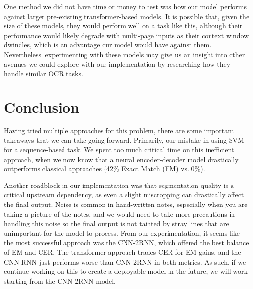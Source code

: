 \documentclass[11pt]{article}
\begin{document}
One method we did not have time or money to test was how our model performs against larger pre-existing transformer-based models. It is possible that, given the size of these models, they would perform well on a task like this, although their performance would likely degrade with multi-page inputs as their context window dwindles, which is an advantage our model would have against them. Nevertheless, experimenting with these models may give us an insight into other avenues we could explore with our implementation by researching how they handle similar OCR tasks.

\section{Conclusion}

Having tried multiple approaches for this problem, there are some important takeaways that we can take going forward. Primarily, our mistake in using SVM for a sequence-based task. We spent too much critical time on this inefficient approach, when we now know that a neural encoder-decoder model drastically outperforms classical approaches (42\% Exact Match (EM) vs. 0\%).

Another roadblock in our implementation was that segmentation quality is a critical upstream dependency, as even a slight miscropping can drastically affect the final output. Noise is common in hand-written notes, especially when you are taking a picture of the notes, and we would need to take more precautions in handling this noise so the final output is not tainted by stray lines that are unimportant for the model to process. From our experimentation, it seems like the most successful approach was the CNN-2RNN, which offered the best balance of EM and CER. The transformer approach trades CER for EM gains, and the CNN-RNN just performs worse than CNN-2RNN in both metrics. As such, if we continue working on this to create a deployable model in the future, we will work starting from the CNN-2RNN model.


\end{document}
